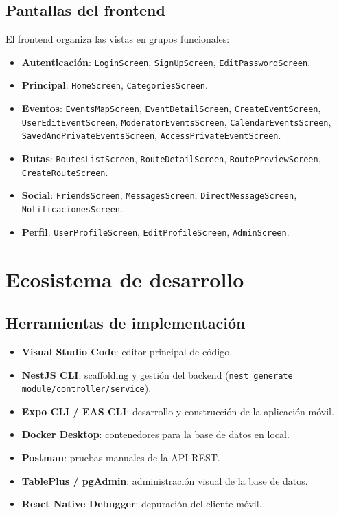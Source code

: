 \subsection{Pantallas del frontend}

El frontend organiza las vistas en grupos funcionales:

\begin{itemize}
    \item \textbf{Autenticación}: \texttt{LoginScreen}, \texttt{SignUpScreen}, \texttt{EditPasswordScreen}.
    \item \textbf{Principal}: \texttt{HomeScreen}, \texttt{CategoriesScreen}.
    \item \textbf{Eventos}: \texttt{EventsMapScreen}, \texttt{EventDetailScreen}, \texttt{CreateEventScreen}, \texttt{UserEditEventScreen}, \texttt{ModeratorEventsScreen}, \texttt{CalendarEventsScreen}, \texttt{SavedAndPrivateEventsScreen}, \texttt{AccessPrivateEventScreen}.
    \item \textbf{Rutas}: \texttt{RoutesListScreen}, \texttt{RouteDetailScreen}, \texttt{RoutePreviewScreen}, \texttt{CreateRouteScreen}.
    \item \textbf{Social}: \texttt{FriendsScreen}, \texttt{MessagesScreen}, \texttt{DirectMessageScreen}, \texttt{NotificacionesScreen}.
    \item \textbf{Perfil}: \texttt{UserProfileScreen}, \texttt{EditProfileScreen}, \texttt{AdminScreen}.
\end{itemize}

\section{Ecosistema de desarrollo}

\subsection{Herramientas de implementación}

\begin{itemize}
    \item \textbf{Visual Studio Code}: editor principal de código.
    \item \textbf{NestJS CLI}: scaffolding y gestión del backend (\texttt{nest generate module/controller/service}).
    \item \textbf{Expo CLI / EAS CLI}: desarrollo y construcción de la aplicación móvil.
    \item \textbf{Docker Desktop}: contenedores para la base de datos en local.
    \item \textbf{Postman}: pruebas manuales de la API REST.
    \item \textbf{TablePlus / pgAdmin}: administración visual de la base de datos.
    \item \textbf{React Native Debugger}: depuración del cliente móvil.
\end{itemize}

